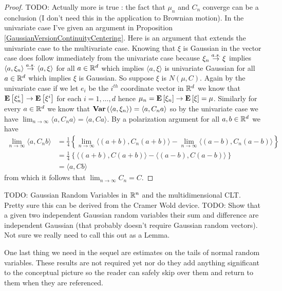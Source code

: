 \begin{proof}
TODO: Actually more is true : the fact that $\mu_n$ and $C_n$ converge
can be a conclusion (I don't need this in the application to Brownian motion).  
In the univariate case I've given an argument in Proposition \ref{GaussianVersionContinuityCentering}.
Here is an argument that extends the univariate case to the multivariate case.  Knowing that $\xi$ is Gaussian in the vector case does follow immediately from the univariate case
because $\xi_n \overset{a.s.}\to \xi$ implies $\langle a, \xi_n \rangle \overset{a.s.}\to \langle a, \xi \rangle$ for all $a \in \mathbb{R}^d$ which
implies $\langle a, \xi \rangle$ is univariate Gaussian for all $a \in \mathbb{R}^d$ which implies $\xi$ is Gaussian.  So suppose $\xi$ is $N(\mu,C)$.  Again by the univariate
case if we let $e_i$ be the $i^{th}$ coordinate vector in $\mathbb{R}^d$ we know that $\textbf{E}\left[\xi^i_n\right] \to \textbf{E}\left[\xi^i\right]$ for each
$i=1, \dotsc, d$ hence $\mu_n = \textbf{E}\left[\xi_n\right] \to \textbf{E}\left[\xi\right]=\mu$.  Similarly for every $a \in \mathbb{R}^d$ we know that
$\textbf{Var} \left (\langle a, \xi_n \rangle \right ) = \langle a, C_n a \rangle$ so by the univariate case we have $\lim_{n \to \infty} \langle a, C_n a \rangle = \langle a, C a \rangle$.  By a polarization argument for all $a,b \in \mathbb{R}^d$ we have
\begin{align*}
\lim_{n \to \infty} \langle a, C_n b \rangle 
&= \frac{1}{4} \left \lbrace \lim_{n \to \infty} \langle(a+b), C_n (a+b) \rangle - \lim_{n \to \infty} \langle(a-b), C_n (a-b) \rangle \right \rbrace \\
&=\frac{1}{4} \left \lbrace \langle(a+b), C (a+b) \rangle - \langle(a-b), C (a-b) \rangle \right \rbrace \\
&= \langle a, C b \rangle
\end{align*}
from which it follows that $\lim_{n \to \infty} C_n = C$.
\end{proof}

TODO: Gaussian Random Variables in $\mathbb{R}^n$ and the multidimensional
CLT.  Pretty sure this can be derived from the Cramer Wold device.
TODO: Show that a
given two independent Gaussian random variables their sum and
difference are independent Gaussian (that probably doesn't require
Gaussian random vectors).  Not sure we really need to call this out as a Lemma.

One last thing we need in the sequel are estimates on the tails of
normal random variables.  These results are not required yet nor do
they add anything significant to the conceptual picture so the
reader can safely skip over them and return to them when they are
referenced.


